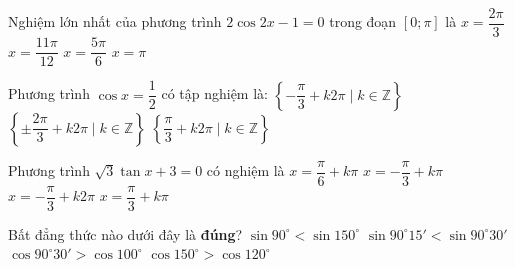 \begin{ex}%
	Nghiệm lớn nhất của phương trình $2\cos 2x-1=0$ trong  đoạn $\left[0;\pi \right]$ là
	 \choice
		{$x=\dfrac{2\pi}{3}$} 
		{$x=\dfrac{11\pi}{12}$} 
		{\True $x=\dfrac{5\pi}{6}$} 
		{$x=\pi $} 
	 \loigiai{
		Ta có $2\cos 2x-1=0 \Leftrightarrow \cos 2x=\dfrac{1}{2}=\cos \dfrac{\pi}{3}  \Leftrightarrow \left[
		\begin{aligned}
			&x=\dfrac{\pi}{6}+k\pi  \\
			 &x=-\dfrac{\pi}{6}+k\pi
		\end{aligned}\right. (k\in \mathbb{Z})$. \\
	Vì  $x\in \left[0;\pi \right] $ nên $ x\in \left\{\dfrac{\pi}{6};\dfrac{5\pi}{6}\right\}$.}
\end{ex}

\begin{ex}%
	Phương trình $\cos x=\dfrac{1}{2}$ có tập  nghiệm là:
	 \choice
		 {$\left\{-\dfrac{\pi}{3}+k2\pi \mid k \in \mathbb{Z} \right\}$}
		{$\left\{\pm \dfrac{2\pi}{3}+k2\pi  \mid k \in \mathbb{Z} \right\}$}
		{$\left\{\dfrac{\pi}{3}+k2\pi \mid k \in \mathbb{Z} \right\}$} 
		{}
\end{ex}

\begin{ex}%
	Phương trình  $\sqrt{3}\tan x+3=0$ có nghiệm là
	 \choice
		 {$x=\dfrac{\pi}{6}+k\pi$}
		{\True  $x=-\dfrac{\pi}{3}+k\pi$}
		 {$x=-\dfrac{\pi}{3}+k2\pi$}
		{$x=\dfrac{\pi}{3}+k\pi$} 
\end{ex}

\begin{ex}%
	Bất đẳng thức nào dưới đây  là \textbf{đúng}?
	 \choice
		{$\sin 90^\circ <  \sin 150^\circ$}
		{$\sin 90^\circ  15' < \sin 90^\circ 30'$}
		 {\True $\cos 90^\circ 30' > \cos 100^\circ$}
		{$\cos 150^\circ  > \cos 120^\circ$}
\end{ex}

